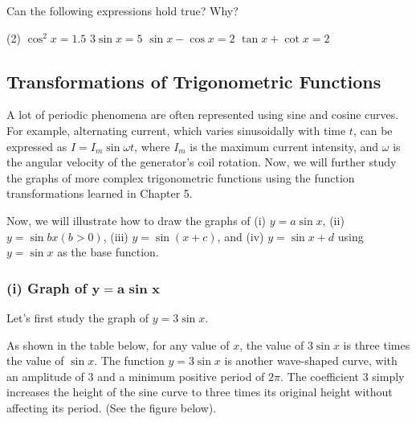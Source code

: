 \documentclass{report}
\begin{document}
        Can the following expressions hold true? Why?
        \begin{tasks}[label=(\alph*)](2)
            \task $\cos ^2 x=1.5$
            \task $3 \sin x=5$
            \task $\sin x-\cos x=2$
            \task $\tan x+\cot x=2$
        \end{tasks}

        \newpage
        \subsection*{Transformations of Trigonometric Functions}

        A lot of periodic phenomena are often represented using sine and cosine curves. For example, alternating current, which varies sinusoidally with time $t$, can be expressed as $I=I_m \sin \omega t$, where $I_m$ is the maximum current intensity, and $\omega$ is the angular velocity of the generator's coil rotation. Now, we will further study the graphs of more complex trigonometric functions using the function transformations learned in Chapter 5.

        Now, we will illustrate how to draw the graphs of (i) $y=a \sin x$, (ii) $y=\sin b x(b>0)$, (iii) $y=\sin (x+c)$, and (iv) $y=\sin x+d$ using $y=\sin x$ as the base function.

        \vspace{-1em}
        \subsubsection*{(i) Graph of $\mathbf{y=a \text{ sin } x}$}
        
        Let's first study the graph of $y=3 \sin x$.

        As shown in the table below, for any value of $x$, the value of $3 \sin x$ is three times the value of $\sin x$. The function $y=3 \sin x$ is another wave-shaped curve, with an amplitude of 3 and a minimum positive period of $2 \pi$. The coefficient 3 simply increases the height of the sine curve to three times its original height without affecting its period. (See the figure below).
\end{document}
